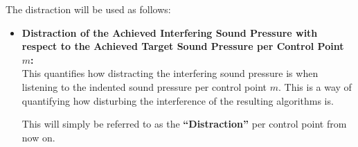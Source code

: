 The distraction will be used as follows:
\begin{itemize}
    \item \textbf{Distraction of the Achieved Interfering Sound Pressure with respect to the Achieved Target Sound Pressure per Control Point $m$:}\\
        This quantifies how distracting the interfering sound pressure is when listening to the indented sound pressure per control point $m$. 
        This is a way of quantifying how disturbing the interference of the resulting algorithms is.

        This will simply be referred to as the \textbf{``Distraction''} per control point from now on.
\end{itemize}
